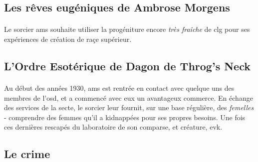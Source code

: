 \subsection{Les rêves eugéniques de Ambrose Morgens}

\paragraph{} Le sorcier \gls{ams} souhaite utiliser la progéniture encore \emph{très fraîche} de 
\gls{clg} pour ses expériences de création de raçe supérieur.

\subsection{L'Ordre Esotérique de Dagon de Throg's Neck}

\paragraph{} Au début des années 1930, \gls{ams} est rentrée en contact avec quelque uns des membres
de l'\gls{osd}, et a commencé avec eux un avantageux commerce. En échange des services de la secte, 
le sorcier leur fournit, sur une base régulière, des \emph{femelles} - comprendre des femmes qu'il a 
kidnappées pour ses propres besoins. Une fois ces dernières rescapés du laboratoire de son comparse, et 
créature, \gls{evk}.

\subsection{Le crime}

